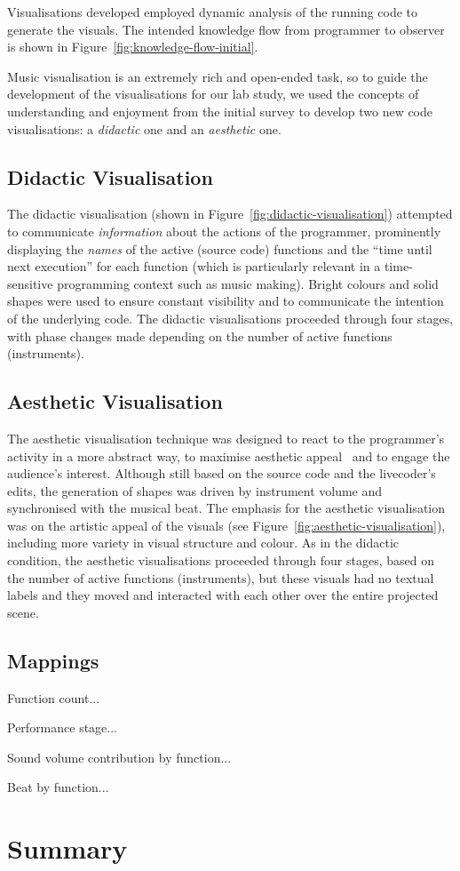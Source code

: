 Visualisations developed employed dynamic analysis of the running code to generate the visuals. The intended knowledge flow from programmer to observer is shown in Figure~\ref{fig:knowledge-flow-initial}.

Music visualisation is an extremely rich
and open-ended task, so to guide the development of the visualisations
for our lab study, we used the concepts of understanding and enjoyment
from the initial survey to develop two new code visualisations: a
\emph{didactic} one and an \emph{aesthetic} one.

\subsection{Didactic Visualisation}
\label{sec:didactic-visualisation}

The didactic visualisation (shown in
Figure~\ref{fig:didactic-visualisation}) attempted to communicate
\emph{information} about the actions of the programmer, prominently
displaying the \emph{names} of the active (source code) functions and
the ``time until next execution'' for each function (which is
particularly relevant in a time-sensitive programming context such as
music making). Bright colours and solid shapes were used to ensure
constant visibility and to communicate the intention of the underlying
code. The didactic visualisations proceeded through four stages, with
phase changes made depending on the number of active functions
(instruments).

\subsection{Aesthetic Visualisation}
\label{sec:aesthetic-visualisation}

The aesthetic visualisation technique was designed
to react to the programmer's activity in a more abstract way, to
maximise aesthetic appeal~\cite{Cawthon2007} and to engage the
audience's interest. Although still based on the source code and the
livecoder's edits, the generation of shapes was driven by instrument
volume and synchronised with the musical beat. The emphasis for the
aesthetic visualisation was on the artistic appeal of the visuals (see
Figure~\ref{fig:aesthetic-visualisation}), including more variety in
visual structure and colour. As in the didactic condition, the
aesthetic visualisations proceeded through four stages, based on the
number of active functions (instruments), but these visuals had no
textual labels and they moved and interacted with each other over the
entire projected scene.

\subsection{Mappings}

Function count...

Performance stage...

Sound volume contribution by function...

Beat by function...

\section{Summary}

 



